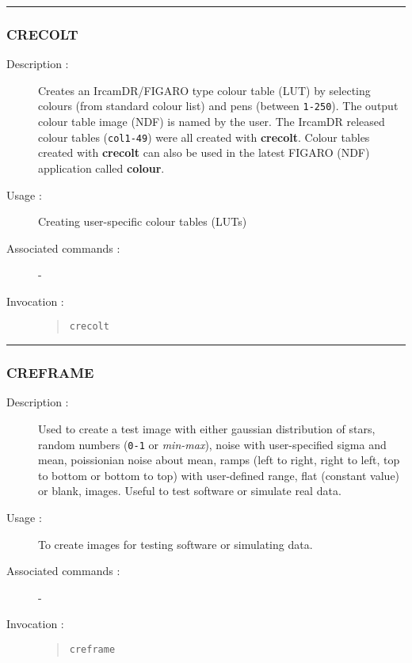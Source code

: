 \hrule
\subsubsection*{\label{CRECOLT}CRECOLT}

\begin{description}

\item[Description :] Creates an {\sc IrcamDR}/FIGARO type colour table
(LUT) by selecting colours (from standard colour list) and pens
(between {\tt 1-250}).  The output colour table image (NDF) is named by
the user.  The {\sc IrcamDR} released colour tables ({\tt col1-49})
were all created with {\bf crecolt}.  Colour tables created with {\bf
crecolt} can also be used in the latest FIGARO (NDF) application called
{\bf colour}.

\item[Usage :] Creating user-specific colour tables (LUTs)
\item[Associated commands :] -
\item[Invocation :]

\begin{quote}{\tt  crecolt }\end{quote}

\end{description}

\hrule
\subsubsection*{\label{CREFRAME}CREFRAME}

\begin{description}

\item[Description :] Used to create a test image with either gaussian
distribution of stars, random numbers ({\tt 0-1} or {\it min-max}),
noise with user-specified sigma and mean, poissionian noise about mean,
ramps (left to right, right to left, top to bottom or bottom to top)
with user-defined range, flat (constant value) or blank, images.
Useful to test software or simulate real data.

\item[Usage :] To create images for testing software or simulating data.
\item[Associated commands :] -
\item[Invocation :]

\begin{quote}{\tt  creframe }\end{quote}

\end{description}

